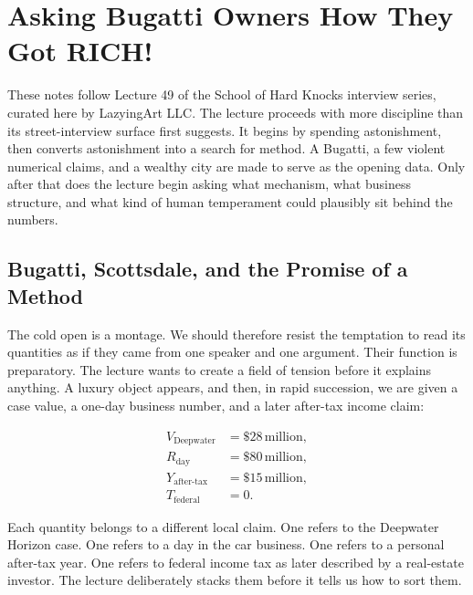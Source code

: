 \chapter{Asking Bugatti Owners How They Got RICH!}

These notes follow Lecture 49 of the School of Hard Knocks interview series, curated here by LazyingArt LLC. The lecture proceeds with more discipline than its street-interview surface first suggests. It begins by spending astonishment, then converts astonishment into a search for method. A Bugatti, a few violent numerical claims, and a wealthy city are made to serve as the opening data. Only after that does the lecture begin asking what mechanism, what business structure, and what kind of human temperament could plausibly sit behind the numbers.

\section{Bugatti, Scottsdale, and the Promise of a Method}

The cold open is a montage. We should therefore resist the temptation to read its quantities as if they came from one speaker and one argument. Their function is preparatory. The lecture wants to create a field of tension before it explains anything. A luxury object appears, and then, in rapid succession, we are given a case value, a one-day business number, and a later after-tax income claim:

\begin{align}
V_{\text{Deepwater}}&=\$28\,\text{million},\\
R_{\text{day}}&=\$80\,\text{million},\\
Y_{\text{after-tax}}&=\$15\,\text{million},\\
T_{\text{federal}}&=0.
\end{align}

Each quantity belongs to a different local claim. One refers to the Deepwater Horizon case. One refers to a day in the car business. One refers to a personal after-tax year. One refers to federal income tax as later described by a real-estate investor. The lecture deliberately stacks them before it tells us how to sort them.

\begin{figure}
\centering
{}
\end{figure}

